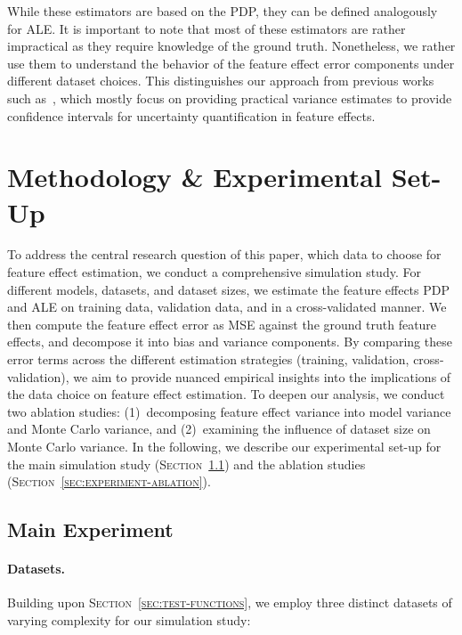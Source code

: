 \documentclass[runningheads]{llncs}
\begin{document}
\noindent While these estimators are based on the PDP, they
can be defined analogously for ALE.  %
It is important to note that most of these estimators are rather
impractical as they require knowledge of the ground truth. Nonetheless,
we rather use them to understand the behavior of the feature
effect error components under different dataset choices. This
distinguishes our approach from previous works such as~\cite{molnar_relating_2023},
which mostly focus on providing practical variance estimates to provide
confidence intervals for uncertainty quantification in feature effects. 


\section{Methodology \& Experimental Set-Up}\label{sec:methodology-set-up}

To address the central research question of this paper, which data to
choose for feature effect estimation, we conduct a comprehensive simulation
study. For different models,
datasets, and dataset sizes, we estimate the feature effects PDP and ALE on
training data, validation data, and in a cross-validated manner. We then
compute the feature effect error as MSE against the ground truth
feature effects, and decompose it into bias and variance components. By
comparing these error terms across the different estimation strategies
(training, validation, cross-validation), we aim to provide nuanced empirical
insights into the implications of the data choice on feature effect estimation.
To deepen our analysis, we conduct two ablation studies: (1)~decomposing feature
effect variance into model variance and Monte Carlo variance, and (2)~examining
the influence of dataset size on Monte Carlo variance.
In the following, we describe our experimental set-up for the main simulation
study (\textsc{Section~\ref{sec:experiment-main}}) and the ablation studies
(\textsc{Section~\ref{sec:experiment-ablation}}).

\subsection{Main Experiment}\label{sec:experiment-main}

\paragraph{Datasets.}
Building upon \textsc{Section~\ref{sec:test-functions}}, we employ three
distinct datasets of varying complexity for our simulation study:
\end{document}
